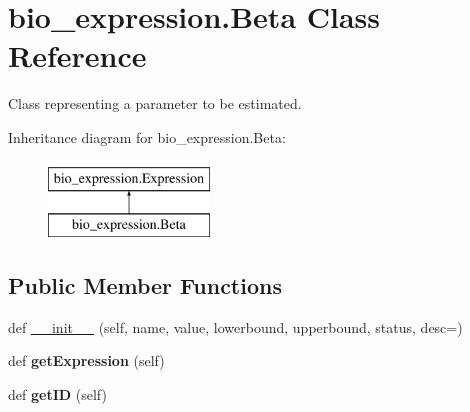 \hypertarget{classbio__expression_1_1_beta}{}\section{bio\+\_\+expression.\+Beta Class Reference}
\label{classbio__expression_1_1_beta}


Class representing a parameter to be estimated.  


Inheritance diagram for bio\+\_\+expression.\+Beta\+:\begin{figure}[H]
\begin{center}
\leavevmode
\includegraphics[height=2.000000cm]{classbio__expression_1_1_beta}
\end{center}
\end{figure}
\subsection*{Public Member Functions}
\begin{DoxyCompactItemize}
\item 
def \hyperlink{classbio__expression_1_1_beta_a3702c09cb80e1ed9fde790cca1031842}{\+\_\+\+\_\+init\+\_\+\+\_\+} (self, name, value, lowerbound, upperbound, status, desc=\textquotesingle{}\textquotesingle{})
\item 
def {\bfseries get\+Expression} (self)\hypertarget{classbio__expression_1_1_beta_a7d4f19902aee5b0bfd854d685f57f22e}{}\label{classbio__expression_1_1_beta_a7d4f19902aee5b0bfd854d685f57f22e}

\item 
def {\bfseries get\+ID} (self)\hypertarget{classbio__expression_1_1_beta_a6a253bc47ef7b3765df67712434ad09f}{}\label{classbio__expression_1_1_beta_a6a253bc47ef7b3765df67712434ad09f}

\end{DoxyCompactItemize}
